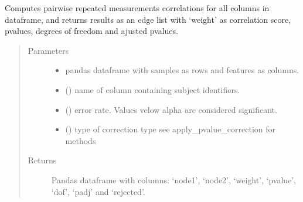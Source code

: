\documentclass[letterpaper,10pt,english]{sphinxmanual}
\begin{document}

\begin{fulllineitems}
\label{\detokenize{_autosummary/analytics_core.analytics:analytics_core.analytics.analytics.run_rm_correlation}}
Computes pairwise repeated measurements correlations for all columns in dataframe, and returns results as an edge list with ‘weight’ as correlation score, p\sphinxhyphen{}values, degrees of freedom and ajusted p\sphinxhyphen{}values.
\begin{quote}\begin{description}
\item[{Parameters}] \leavevmode\begin{itemize}
\item {} 
 \textendash{} pandas dataframe with samples as rows and features as columns.

\item {} 
 () \textendash{} name of column containing subject identifiers.

\item {} 
 () \textendash{} error rate. Values velow alpha are considered significant.

\item {} 
 () \textendash{} type of correction type see apply\_pvalue\_correction for methods

\end{itemize}

\item[{Returns}] \leavevmode
Pandas dataframe with columns: ‘node1’, ‘node2’, ‘weight’, ‘pvalue’, ‘dof’, ‘padj’ and ‘rejected’.


\end{description}
\end{quote}
\end{fulllineitems}
\end{document}
